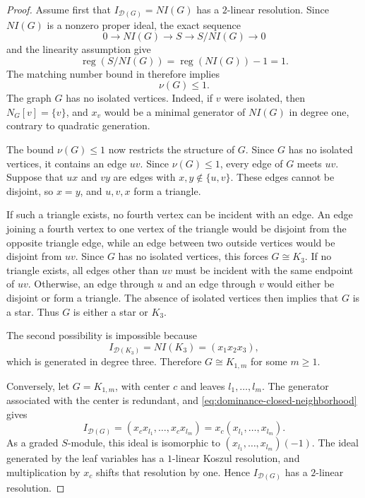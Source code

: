 \documentclass[11pt]{amsart}
\theoremstyle{definition}
\theoremstyle{remark}
\numberwithin{equation}{section}
\newcommand{\DD}{\mathcal D}
\newcommand{\reg}{\operatorname{reg}}
\begin{document}
	\begin{proof}
		Assume first that \(I_{\DD(G)}=NI(G)\) has a \(2\)-linear resolution. Since
		\(NI(G)\) is a nonzero proper ideal, the exact sequence
		\[
		0\longrightarrow NI(G)\longrightarrow S\longrightarrow S/NI(G)
		\longrightarrow0
		\]
		and the linearity assumption give
		\[
		\reg(S/NI(G))=\reg(NI(G))-1=1.
		\]
		The matching number bound in
		\cite[Theorem~1.2]{ChakrabortyJosephRoySingh2025} therefore implies
		\[
		\nu(G)\le1.
		\]
		The graph \(G\) has no isolated vertices. Indeed, if \(v\) were isolated,
		then \(N_G[v]=\{v\}\), and \(x_v\) would be a minimal generator of
		\(NI(G)\) in degree one, contrary to quadratic generation.
		
		The bound \(\nu(G)\le1\) now restricts the structure of \(G\). Since \(G\)
		has no isolated vertices, it contains an edge \(uv\). Since \(\nu(G)\le1\), every edge of
		\(G\) meets \(uv\). Suppose that \(ux\) and \(vy\) are edges with
		\(x,y\notin\{u,v\}\). These edges cannot be disjoint, so \(x=y\), and
		\(u,v,x\) form a triangle.
		
		If such a triangle exists, no fourth vertex can be incident with an edge. An
		edge joining a fourth vertex to one vertex of the triangle would be disjoint
		from the opposite triangle edge, while an edge between two outside vertices
		would be disjoint from \(uv\). Since \(G\) has no isolated vertices, this
		forces \(G\cong K_3\). If no triangle exists, all edges other than \(uv\)
		must be incident with the same endpoint of \(uv\). Otherwise, an edge through
		\(u\) and an edge through \(v\) would either be disjoint or form a triangle.
		The absence of isolated vertices then implies that \(G\) is a star. Thus
		\(G\) is either a star or \(K_3\).
		
		The second possibility is impossible because
		\[
		I_{\DD(K_3)}=NI(K_3)=(x_1x_2x_3),
		\]
		which is generated in degree three. Therefore \(G\cong K_{1,m}\) for some
		\(m\ge1\).
		
		Conversely, let \(G=K_{1,m}\), with center \(c\) and leaves
		\(l_1,\ldots,l_m\). The generator associated with the center is redundant, and
		\eqref{eq:dominance-closed-neighborhood} gives
		\[
		I_{\DD(G)}
		=(x_cx_{l_1},\ldots,x_cx_{l_m})
		=x_c(x_{l_1},\ldots,x_{l_m}).
		\]
		As a graded \(S\)-module, this ideal is isomorphic to
		\((x_{l_1},\ldots,x_{l_m})(-1)\). The ideal generated by the leaf variables
		has a \(1\)-linear Koszul resolution, and multiplication by \(x_c\) shifts
		that resolution by one. Hence \(I_{\DD(G)}\) has a \(2\)-linear resolution.
	\end{proof}
	
\end{document}
